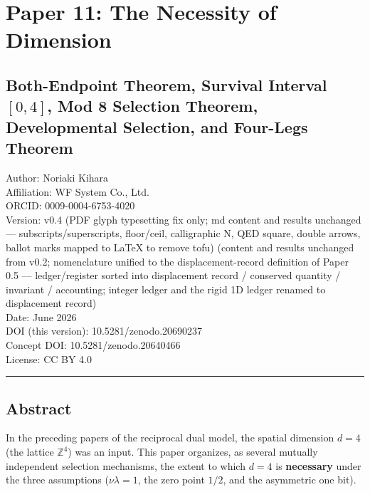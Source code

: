 \documentclass[
]{ltjsarticle}
\author{}
\date{}
\begin{document}
\section{Paper 11: The Necessity of
Dimension}\label{paper-11-the-necessity-of-dimension}

\subsection{\texorpdfstring{Both-Endpoint Theorem, Survival Interval
\([0,4]\), Mod 8 Selection Theorem, Developmental Selection, and
Four-Legs
Theorem}{Both-Endpoint Theorem, Survival Interval {[}0,4{]}, Mod 8 Selection Theorem, Developmental Selection, and Four-Legs Theorem}}\label{both-endpoint-theorem-survival-interval-04-mod-8-selection-theorem-developmental-selection-and-four-legs-theorem}

Author: Noriaki Kihara\\
Affiliation: WF System Co., Ltd.\\
ORCID: 0009-0004-6753-4020\\
Version: v0.4 (PDF glyph typesetting fix only; md content and results
unchanged --- subscripts/superscripts, floor/ceil, calligraphic N, QED
square, double arrows, ballot marks mapped to LaTeX to remove tofu)
(content and results unchanged from v0.2; nomenclature unified to the
displacement-record definition of Paper 0.5 --- ledger/register sorted
into displacement record / conserved quantity / invariant / accounting;
integer ledger and the rigid 1D ledger renamed to displacement record)\\
Date: June 2026\\
DOI (this version): 10.5281/zenodo.20690237\\
Concept DOI: 10.5281/zenodo.20640466\\
License: CC BY 4.0

\begin{center}\rule{0.5\linewidth}{0.5pt}\end{center}

\subsection{Abstract}\label{abstract}

In the preceding papers of the reciprocal dual model, the spatial
dimension \(d=4\) (the lattice \(\mathbb{Z}^4\)) was an input. This
paper organizes, as several mutually independent selection mechanisms,
the extent to which \(d=4\) is \textbf{necessary} under the three
assumptions (\(\nu\lambda=1\), the zero point \(1/2\), and the
asymmetric one bit).
\end{document}
